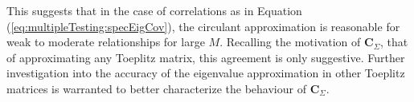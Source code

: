 \documentclass[letterpaper,12pt,oneside,final]{article}
\newcommand{\m}[1]{\mathbf{#1}}               %
\newcommand{\abs}[1]{\lvert{#1}\rvert}              %
\begin{document}
This suggests that in the case of correlations as in Equation (\ref{eq:multipleTesting:specEigCov}), the circulant approximation is reasonable for weak to moderate relationships for large $M$. Recalling the motivation of $\m{C}_{\Sigma}$, that of approximating any Toeplitz matrix, this agreement is only suggestive. Further investigation into the accuracy of the eigenvalue approximation in other Toeplitz matrices is warranted to better characterize the behaviour of $\m{C}_{\Sigma}$.






\end{document}
